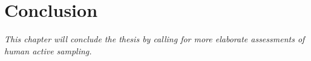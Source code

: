 \documentclass[oneside, 11pt]{book}
\begin{document}
\chapter{Conclusion}
\emph{This chapter will conclude the thesis by calling for more elaborate assessments of human active sampling.}


{\footnotesize}


\end{document}
